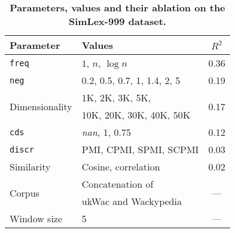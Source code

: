 \begin{table}
  \centering
  \footnotesize
  \begin{tabular}{llc}
    \toprule
    Parameter & Values & $R^2$ \\
    \midrule
    \texttt{freq} & $1$, $n$, $\log n$                         & 0.36 \\
    \texttt{neg} & 0.2, 0.5, 0.7, 1, 1.4, 2, 5                 & 0.19 \\
    \multirow{2}{*}{Dimensionality} & 1K, 2K, 3K, 5K,          & \multirow{2}{*}{0.17} \\
                                    & 10K, 20K, 30K, 40K, 50K                          \\
    \texttt{cds} & \textit{nan}, 1, 0.75                       & 0.12 \\
    \texttt{discr} & PMI, CPMI, SPMI, SCPMI                    & 0.03 \\
    Similarity & Cosine, correlation                           & 0.02 \\
    \multirow{2}{*}{Corpus} & Concatenation of                 & \multirow{2}{*}{---}  \\
                            & ukWac and Wackypedia                                     \\
    Window size & 5                                            & ---  \\
    \bottomrule
  \end{tabular}
  \caption{\textbf{Parameters, values and their ablation on the SimLex-999 dataset.}}
\label{tab:parameters}
\end{table}

